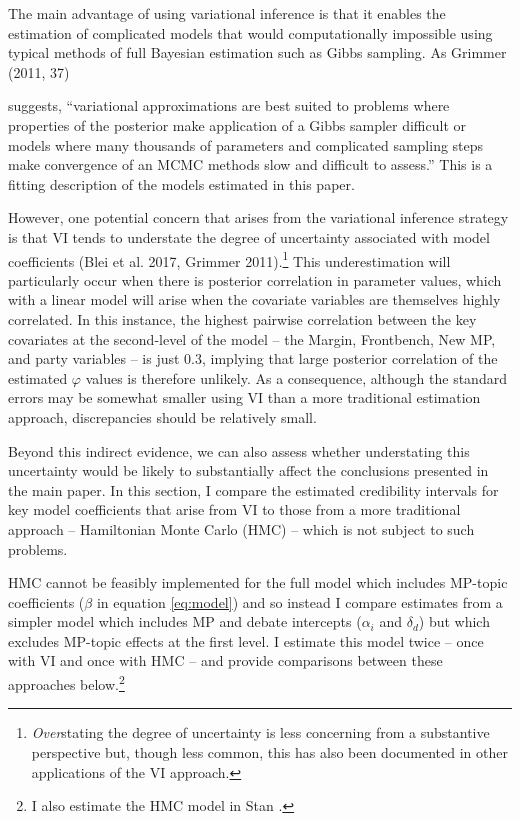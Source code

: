 \documentclass[12pt]{article}
\begin{document}
The main advantage of using variational inference is that it enables the estimation of complicated models that would computationally impossible using typical methods of full Bayesian estimation such as Gibbs sampling. As Grimmer (2011, 37) 

suggests, ``variational approximations are best suited to problems where properties of the posterior make application of a Gibbs sampler difficult or models where many thousands of parameters and complicated sampling steps make convergence of an MCMC methods slow and difficult to assess.'' This is a fitting description of the models estimated in this paper.  

However, one potential concern that arises from the variational inference strategy is that VI tends to understate the degree of uncertainty associated with model coefficients (Blei et al. 2017, Grimmer 2011).\footnote{\emph{Over}stating the degree of uncertainty is less concerning from a substantive perspective but, though less common, this has also been documented in other applications of the VI approach.} This underestimation will particularly occur when there is posterior correlation in parameter values, which with a linear model will arise when the covariate variables are themselves highly correlated. In this instance, the highest pairwise correlation between the key covariates at the second-level of the model -- the Margin, Frontbench, New MP, and party variables -- is just 0.3, implying that large posterior correlation of the estimated $\varphi$ values is therefore unlikely. As a consequence, although the standard errors may be somewhat smaller using VI than a more traditional estimation approach, discrepancies should be relatively small. 

Beyond this indirect evidence, we can also assess whether understating this uncertainty would be likely to substantially affect the conclusions presented in the main paper. In this section, I compare the estimated credibility intervals for key model coefficients that arise from VI to those from a more traditional approach -- Hamiltonian Monte Carlo (HMC) -- which is not subject to such problems.  

HMC cannot be feasibly implemented for the full model which includes MP-topic coefficients ($\beta$ in equation \ref{eq:model}) and so instead I compare estimates from a simpler model which includes MP and debate intercepts ($\alpha_i$ and $\delta_d$) but which excludes MP-topic effects at the first level. I estimate this model twice -- once with VI and once with HMC -- and provide comparisons between these approaches below.\footnote{I also estimate the HMC model in Stan \citep{carpenter2016stan}.}
\end{document}
